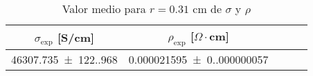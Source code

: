 \begin{table}[H]
    \centering
\begin{tabular}{ccccc}
\toprule
$\sigma_{\exp}$ [S/cm] & $\rho_{\exp}$ [$\Omega \cdot$cm] \\
\midrule
\num{46307.735(122.968)} & \num{0.000021595(0.000000057)} \\
\bottomrule
\end{tabular}
    \caption{Valor medio para $r=0.31$ cm de $\sigma$ y $\rho $}
    \label{Tab:S3}
\end{table}
